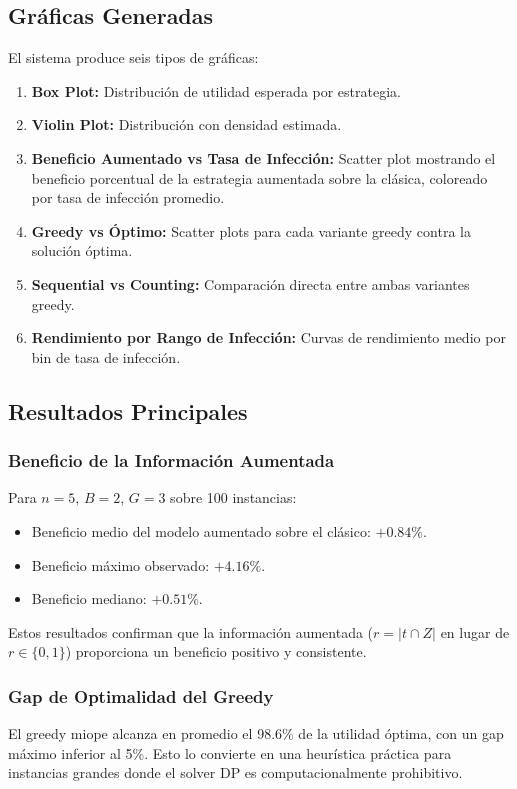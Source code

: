 \documentclass[11pt, a4paper]{article}
\begin{document}
\subsection{Gr\'aficas Generadas}
El sistema produce seis tipos de gr\'aficas:
\begin{enumerate}[nosep]
    \item \textbf{Box Plot:} Distribuci\'on de utilidad esperada por estrategia.
    \item \textbf{Violin Plot:} Distribuci\'on con densidad estimada.
    \item \textbf{Beneficio Aumentado vs Tasa de Infecci\'on:} Scatter plot
    mostrando el beneficio porcentual de la estrategia aumentada sobre la
    cl\'asica, coloreado por tasa de infecci\'on promedio.
    \item \textbf{Greedy vs \'Optimo:} Scatter plots para cada variante greedy
    contra la soluci\'on \'optima.
    \item \textbf{Sequential vs Counting:} Comparaci\'on directa entre ambas
    variantes greedy.
    \item \textbf{Rendimiento por Rango de Infecci\'on:} Curvas de rendimiento
    medio por bin de tasa de infecci\'on.
\end{enumerate}

\subsection{Resultados Principales}

\subsubsection{Beneficio de la Informaci\'on Aumentada}
Para $n=5$, $B=2$, $G=3$ sobre 100 instancias:
\begin{itemize}[nosep]
    \item Beneficio medio del modelo aumentado sobre el cl\'asico: $+0.84\%$.
    \item Beneficio m\'aximo observado: $+4.16\%$.
    \item Beneficio mediano: $+0.51\%$.
\end{itemize}

Estos resultados confirman que la informaci\'on aumentada ($r = |t \cap Z|$
en lugar de $r \in \{0,1\}$) proporciona un beneficio positivo y consistente.

\subsubsection{Gap de Optimalidad del Greedy}
El greedy miope alcanza en promedio el 98.6\% de la utilidad \'optima,
con un gap m\'aximo inferior al 5\%. Esto lo convierte en una heur\'istica
pr\'actica para instancias grandes donde el solver DP es computacionalmente
prohibitivo.
\end{document}
